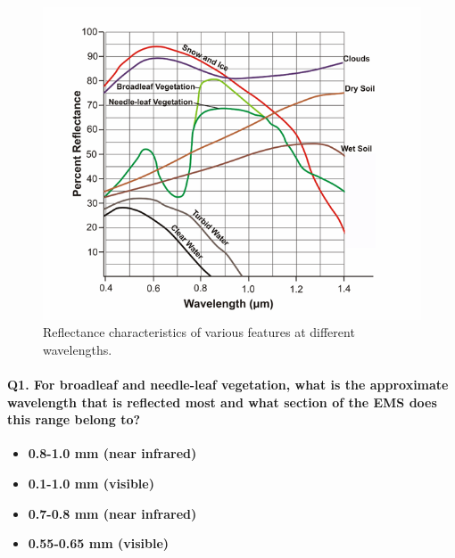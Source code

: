 \documentclass[
]{book}
\providecommand{\tightlist}{%
  \setlength{\itemsep}{0pt}\setlength{\parskip}{0pt}}
\begin{document}
\begin{figure}

{\centering \includegraphics[width=0.8\linewidth]{images/01-spectral-reflectance-characteristics} 

}

\caption{Reflectance characteristics of various features at different wavelengths.}\label{fig:01-spectral-reflectance-characteristics}
\end{figure}

\hypertarget{q1.-for-broadleaf-and-needle-leaf-vegetation-what-is-the-approximate-wavelength-that-is-reflected-most-and-what-section-of-the-ems-does-this-range-belong-to}{%
\paragraph*{Q1. For broadleaf and needle-leaf vegetation, what is the approximate wavelength that is reflected most and what section of the EMS does this range belong to?}\label{q1.-for-broadleaf-and-needle-leaf-vegetation-what-is-the-approximate-wavelength-that-is-reflected-most-and-what-section-of-the-ems-does-this-range-belong-to}}

\begin{itemize}
\tightlist
\item
  \textbf{0.8-1.0 mm (near infrared)}
\item
  \textbf{0.1-1.0 mm (visible) }
\item
  \textbf{0.7-0.8 mm (near infrared) }
\item
  \textbf{0.55-0.65 mm (visible) }
\end{itemize}
\end{document}
